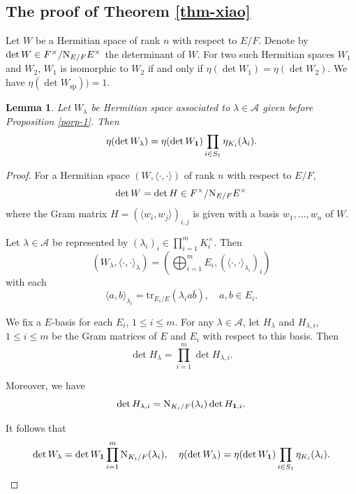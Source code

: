 \documentclass[a4paper]{amsart}
\newcommand{\CA}{{\mathcal {A}}} \newcommand{\CB}{{\mathcal {B}}}
\newcommand{\tr}{{\mathrm{tr}}}\newcommand{\tor}{{\mathrm{tor}}}
\theoremstyle{plain}
\newtheorem{lem}[thm]{Lemma}  \newtheorem{prop}[thm]{Proposition}
\theoremstyle{remark} \newtheorem{remark}[thm]{Remark}
\theoremstyle{exercise} \newtheorem{exercise}[thm]{Exercise}
\theoremstyle{example} \newtheorem{example}[thm]{Example}
\theoremstyle{question} \newtheorem{question}[thm]{Question}
\theoremstyle{assumption} \newtheorem{assumption}[thm]{Assumption}
\numberwithin{equation}{section}
\renewcommand{\sp}{{\mathrm{sp}}}
\begin{document}
\subsection{The proof of Theorem \ref{thm-xiao}}
\label{sec-proof-thm-xiao}

Let $W$ be a Hermitian space of rank $n$ with respect to $E/F$.
Denote by $\det W \in F^\times/{\mathrm {N}}_{E/F} E^\times$ the determinant
of $W$. For two such Hermitian spaces $W_1$ and $W_2$, $W_1$ is
isomorphic to $W_2$ if and only if $\eta(\det W_1) = \eta(\det W_2)$. We have $\eta(\det W_\sp)) = 1$.

\begin{lem}\label{lem-8}
   Let $W_\lambda$ be Hermitian space associated to $\lambda \in \CA$ given before Proposition \ref{porp-1}. Then
   \[\eta(\det W_\lambda) = \eta(\det W_{\bf 1}) \prod_{i \in S_1}
   \eta_{K_i} (\lambda_i).\]
\end{lem}
\begin{proof}
For a Hermitian space $(W,\langle \cdot,\cdot \rangle)$ of
rank $n$ with respect to $E/F$, 
\[\det W = \det H \in F^\times/{\mathrm {N}}_{E/F} E^\times\]
where the Gram matrix $H = (\langle w_i,w_j \rangle)_{i,j}$ is
given with a basis $w_1,\ldots, w_n$ of $W$. 

Let $\lambda \in \CA$ be represented by $(\lambda_i)_i \in \prod_{i=1}^m K_i^\times$. Then 
\[(W_\lambda, \langle \cdot,\cdot \rangle_\lambda) = 
\left( \bigoplus_{i=1}^m E_i, (\langle \cdot,\cdot \rangle_{\lambda_i})_i \right)\]
with each
\[\langle a,b \rangle_{\lambda_i} = \tr_{E_i/E}(\lambda_i a\bar{b}), \quad a,b \in E_i.\]

We fix a $E$-basis for each $E_i$, $1 \leq i \leq m$. 
For any $\lambda \in \CA$, let $H_\lambda$ and $H_{\lambda,i}$, $1 \leq i \leq m$ be the Gram matrices of $E$ and $E_i$ with respect to this basis. Then
\[\det H_\lambda = \prod_{i=1}^m \det H_{\lambda,i}.\]

Moreover, we have
\[\det H_{\lambda,i} = {\mathrm {N}}_{K_i/F}(\lambda_i) \det H_{{\bf 1},i}.\]

It follows that
\[
\det W_\lambda=\det W_{\mathbf 1}\prod_{i=1}^m{\mathrm {N}}_{K_i/F}(\lambda_i),
\quad 
\eta(\det W_\lambda)=\eta(\det W_{\mathbf 1})
\prod_{i\in S_1}\eta_{K_i}(\lambda_i).
\]

\end{proof}
\end{document}
